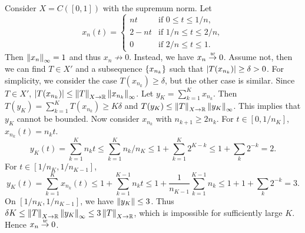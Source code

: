 \begin{example}
    Consider $X = C([0,1])$ with the supremum norm. Let 
    \begin{equation*}
        x_n(t) = \begin{cases}
            nt & \text{if } 0\leq t\leq 1/n,\\
            2-nt & \text{if } 1/n\leq t\leq 2/n,\\
            0 & \text{if } 2/n\leq t\leq 1.
        \end{cases}
    \end{equation*}
    Then $\left\lVert {x_n} \right\rVert_\infty = 1$ and thus $x_n\not\to 0$. Instead, 
    we have $x_n\overset{w}{\to} 0$. Assume not, then we can find 
    $T\in X'$ and a subsequence $\left\{ {x_{n_k}} \right\}$ such that 
    $\left\lvert {T(x_{n_k})} \right\rvert \geq \delta > 0$. For simplicity, we consider 
    the case $T(x_{n_k})\geq\delta$, but the other case is similar. 
    Since $T\in X'$, $\left\lvert {T(x_{n_k})} \right\rvert\leq \left\lVert {T} \right\rVert_{X\to\mathbb{R}}
    \left\lVert {x_{n_k}} \right\rVert_{\infty}$. Let $y_{K} = \sum_{k=1}^{K}x_{n_k}$. 
    Then $T(y_K) = \sum_{k=1}^{K}T(x_{n_k})\geq K\delta$ and 
    $T(y_K)\leq \left\lVert {T} \right\rVert_{X\to\mathbb{R}}\left\lVert {y_K} \right\rVert_\infty$. This implies 
    that $y_K$ cannot be bounded. Now consider $x_{n_k}$ with 
    $n_{k+1}\geq 2n_k$. For $t\in[0,1/n_K]$, $x_{n_k}(t) = n_kt$. 
    \begin{equation*}
        y_K(t) = \sum_{k=1}^{K} n_kt \leq \sum_{k=1}^{K} n_k/n_K 
        \leq 1 + \sum_{k=1}^{K} 2^{K-k} \leq 1 + \sum_k 2^{-k} = 2.
    \end{equation*}
    For $t\in[1/n_K,1/n_{K-1}]$, 
    \begin{equation*}
        y_K(t) = \sum_{k=1}^{K} x_{n_k}(t) 
        \leq 1 + \sum_{k=1}^{K-1} n_kt 
        \leq 1 + \frac{1}{n_{K-1}}\sum_{k=1}^{K-1} n_k 
        \leq 1 + 1 + \sum_k 2^{-k} = 3. 
    \end{equation*}
    On $[1/n_K,1/n_{K-1}]$, we have $\left\lVert {y_K} \right\rVert\leq 3$. 
    Thus $\delta K\leq\left\lVert {T} \right\rVert_{X\to\mathbb{R}}\left\lVert {y_K} \right\rVert_\infty
    \leq 3\left\lVert {T} \right\rVert_{X\to\mathbb{R}}$, which is impossible for 
    sufficiently large $K$. Hence $x_n\overset{w}{\to} 0$.
\end{example}

